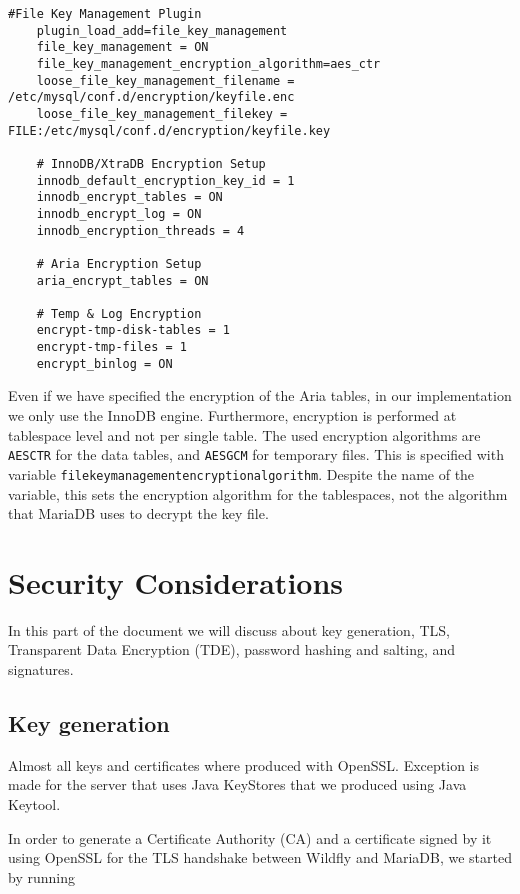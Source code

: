 \begin{lstlisting}[style=XMLStyle]
    #File Key Management Plugin
    plugin_load_add=file_key_management
    file_key_management = ON
    file_key_management_encryption_algorithm=aes_ctr
    loose_file_key_management_filename = /etc/mysql/conf.d/encryption/keyfile.enc
    loose_file_key_management_filekey = FILE:/etc/mysql/conf.d/encryption/keyfile.key

    # InnoDB/XtraDB Encryption Setup
    innodb_default_encryption_key_id = 1
    innodb_encrypt_tables = ON
    innodb_encrypt_log = ON
    innodb_encryption_threads = 4

    # Aria Encryption Setup
    aria_encrypt_tables = ON

    # Temp & Log Encryption
    encrypt-tmp-disk-tables = 1
    encrypt-tmp-files = 1
    encrypt_binlog = ON
\end{lstlisting}

Even if we have specified the encryption of the Aria tables, in our implementation we only use the InnoDB engine. Furthermore, encryption is performed at tablespace level and not per single table. The used encryption algorithms are \texttt{AES\textunderscore CTR} for the data tables, and \texttt{AES\textunderscore GCM} for temporary files. This is specified with variable \texttt{file\textunderscore key\textunderscore management\textunderscore encryption\textunderscore algorithm}. Despite the name of the variable, this sets the encryption algorithm for the tablespaces, not the algorithm that MariaDB uses to decrypt the key file\cite{online:FileKeyManMariaDB}.

\newpage
\chapter{Security Considerations}
\label{chap:secCons}

In this part of the document we will discuss about key generation, TLS, Transparent Data Encryption (TDE), password hashing and salting, and signatures.

\section{Key generation}

Almost all keys and certificates where produced with OpenSSL. Exception is made for the server that uses Java KeyStores that we produced using Java Keytool.

In order to generate a Certificate Authority (CA) and a certificate signed by it using OpenSSL for the TLS handshake between Wildfly and MariaDB, we started by running\\


